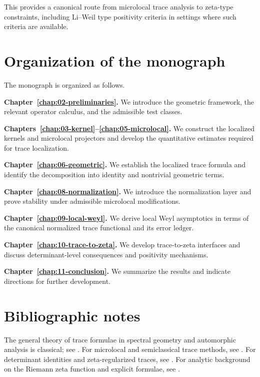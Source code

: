 This provides a canonical route from microlocal trace analysis to zeta-type constraints, including Li--Weil type
positivity criteria in settings where such criteria are available.

\section{Organization of the monograph}
\label{sec:01.organization}

The monograph is organized as follows.

\medskip
\noindent\textbf{Chapter~\ref{chap:02-preliminaries}.}
We introduce the geometric framework, the relevant operator calculus, and the admissible test classes.

\medskip
\noindent\textbf{Chapters~\ref{chap:03-kernel}--\ref{chap:05-microlocal}.}
We construct the localized kernels and microlocal projectors and develop the quantitative estimates required for trace
localization.

\medskip
\noindent\textbf{Chapter~\ref{chap:06-geometric}.}
We establish the localized trace formula and identify the decomposition into identity and nontrivial geometric terms.

\medskip
\noindent\textbf{Chapter~\ref{chap:08-normalization}.}
We introduce the normalization layer and prove stability under admissible microlocal modifications.

\medskip
\noindent\textbf{Chapter~\ref{chap:09-local-weyl}.}
We derive local Weyl asymptotics in terms of the canonical normalized trace functional and its error ledger.

\medskip
\noindent\textbf{Chapter~\ref{chap:10-trace-to-zeta}.}
We develop trace-to-zeta interfaces and discuss determinant-level consequences and positivity mechanisms.

\medskip
\noindent\textbf{Chapter~\ref{chap:11-conclusion}.}
We summarize the results and indicate directions for further development.

\section{Bibliographic notes}
\label{sec:01.bib}

The general theory of trace formulae in spectral geometry and automorphic analysis is classical; see
\cite{Hejhal1983,Buser1992,Iwaniec2002}.
For microlocal and semiclassical trace methods, see \cite{Zworski2012,DyatlovZworski2019}.
For determinant identities and zeta-regularized traces, see \cite{Seeley1967,RaySinger1971,Connes1999}.
For analytic background on the Riemann zeta function and explicit formulae, see \cite{Titchmarsh1986}.

